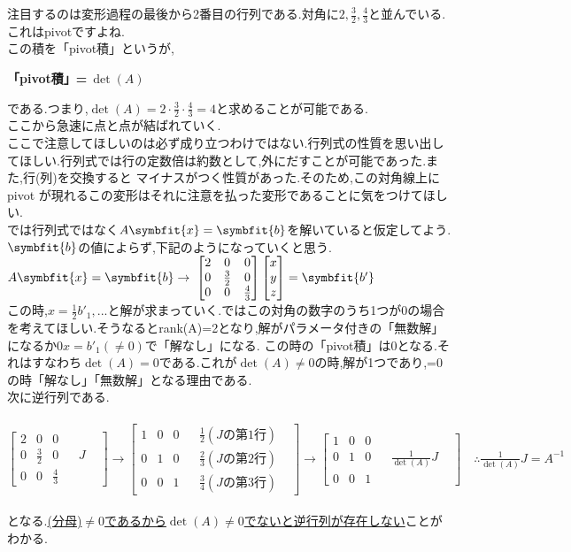注目するのは変形過程の最後から2番目の行列である.対角に$2,\frac{3}{2},\frac{4}{3}$と並んでいる.これはpivotですよね.\\
この積を「pivot積」というが,
\begin{center}
  \bf  「pivot積」=$\: \det(A)$
\end{center}
である.つまり,$\det(A)= 2 \cdot \frac{3}{2} \cdot \frac{4}{3}=4$と求めることが可能である.\\
ここから急速に点と点が結ばれていく.\\
ここで注意してほしいのは必ず成り立つわけではない.行列式の性質を思い出してほしい.行列式では行の定数倍は約数として,外にだすことが可能であった.また,行(列)を交換すると
マイナスがつく性質があった.そのため,この対角線上にpivot
が現れるこの変形はそれに注意を払った変形であることに気をつけてほしい.\\
では行列式ではなく$A\symbfit{x}=\symbfit{b}$を解いていると仮定してよう.\\
$\symbfit{b}$の値によらず,下記のようになっていくと思う.\\
$A\symbfit{x}=\symbfit{b} \rightarrow$
$\begin{bmatrix}
    2 & 0 & 0 \\
0 & \frac{3}{2} & 0 \\
0 & 0 & \frac{4}{3}
\end{bmatrix}
\begin{bmatrix}
    x \\ y \\ z
\end{bmatrix}=
\symbfit{b'}$\\
この時,$x=\frac{1}{2}b'_1,...$と解が求まっていく.ではこの対角の数字のうち1つが0の場合を考えてほしい.そうなるとrank(A)=2となり,解がパラメータ付きの「無数解」になるか$0x=b'_1(\neq 0)$で「解なし」になる.
この時の「pivot積」は0となる.それはすなわち$\det(A)=0$である.これが$\det(A) \neq 0$の時,解が1つであり,=0の時「解なし」「無数解」となる理由である.\\

次に逆行列である.\\\\
$\begin{bmatrix}
    2 & 0 & 0 & & & \\
    0 & \frac{3}{2} & 0 & & J & \\
    0 & 0 & \frac{4}{3} & & &  
\end{bmatrix}
\rightarrow
\begin{bmatrix}
    1 & 0 & 0 & & \frac{1}{2}(Jの第1行) & \\
    0 & 1 & 0 & & \frac{2}{3}(Jの第2行) & \\
    0 & 0 & 1 & &  \frac{3}{4}(Jの第3行)&  
\end{bmatrix}
\rightarrow
\begin{bmatrix}
    1 & 0 & 0 & & & \\
    0 & 1 & 0 & & \frac{1}{\det(A)}J & \\
    0 & 0 & 1 & & &  
\end{bmatrix}
\quad \therefore
\frac{1}{\det(A)}J = A^{-1}$\\\\
となる.\underline{(分母)$\neq 0$であるから$\det(A) \neq 0$でないと逆行列が存在しない}ことがわかる.
